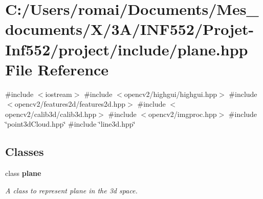 \section{C\+:/\+Users/romai/\+Documents/\+Mes\+\_\+documents/\+X/3\+A/\+I\+N\+F552/\+Projet-\/\+Inf552/project/include/plane.hpp File Reference}
\label{plane_8hpp}
{\ttfamily \#include $<$iostream$>$}\newline
{\ttfamily \#include $<$opencv2/highgui/highgui.\+hpp$>$}\newline
{\ttfamily \#include $<$opencv2/features2d/features2d.\+hpp$>$}\newline
{\ttfamily \#include $<$opencv2/calib3d/calib3d.\+hpp$>$}\newline
{\ttfamily \#include $<$opencv2/imgproc.\+hpp$>$}\newline
{\ttfamily \#include \char`\"{}point3d\+Cloud.\+hpp\char`\"{}}\newline
{\ttfamily \#include \char`\"{}line3d.\+hpp\char`\"{}}\newline
\subsection*{Classes}
\begin{DoxyCompactItemize}
\item 
class \textbf{ plane}
\begin{DoxyCompactList}\small\item\em A class to represent plane in the 3d space. \end{DoxyCompactList}\end{DoxyCompactItemize}
